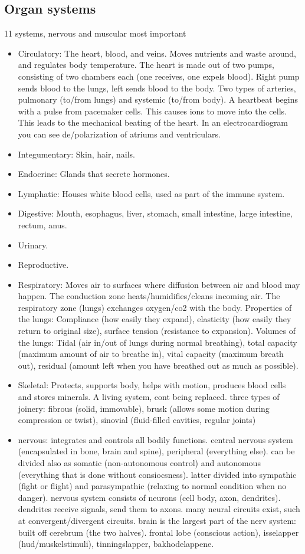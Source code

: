 \subsection{Organ systems}
11 systems, nervous and muscular most important
\begin{itemize}
    \item Circulatory: The heart, blood, and veins. Moves nutrients and waste around, and regulates body temperature. The heart is made out of two pumps, consisting of two chambers each (one receives, one expels blood). Right pump sends blood to the lungs, left sends blood to the body. Two types of arteries, pulmonary (to/from lungs) and systemic (to/from body). A heartbeat begins with a pulse from pacemaker cells. This causes ions to move into the cells. This leads to the mechanical beating of the heart. In an electrocardiogram you can see de/polarization of atriums and ventriculars.
    \item Integumentary: Skin, hair, nails.
    \item Endocrine: Glands that secrete hormones.
    \item Lymphatic: Houses white blood cells, used as part of the immune system.
    \item Digestive: Mouth, esophagus, liver, stomach, small intestine, large intestine, rectum, anus.
    \item Urinary.
    \item Reproductive.
    \item Respiratory: Moves air to surfaces where diffusion between air and blood may happen. The conduction zone heats/humidifies/cleans incoming air. The respiratory zone (lungs) exchanges oxygen/co2 with the body. Properties of the lungs: Compliance (how easily they expand), elasticity (how easily they return to original size), surface tension (resistance to expansion). Volumes of the lungs: Tidal (air in/out of lungs during normal breathing), total capacity (maximum amount of air to breathe in), vital capacity (maximum breath out), residual (amount left when you have breathed out as much as possible).
    \item Skeletal: Protects, supports body, helps with motion, produces blood cells and stores minerals. A living system, cont being replaced.
        three types of joinery: fibrous (solid, immovable), brusk (allows some motion during compression or twist), sinovial (fluid-filled cavities, regular joints)
    \item nervous: integrates and controls all bodily functions. central nervous system (encapsulated in bone, brain and spine), peripheral (everything else). can be divided also as somatic (non-autonomous control) and autonomous (everything that is done without consiocsness). latter divided into sympathic (fight or flight) and parasympathic (relaxing to normal condition when no danger). nervous system consists of neurons (cell body, axon, dendrites). dendrites receive signals, send them to axons. many neural circuits exist, such at convergent/divergent circuits. brain is the largest part of the nerv system: built off cerebrum (the two halves). frontal lobe (conscious action), isselapper (hud/muskelstimuli), tinningslapper, bakhodelappene.

\end{itemize}
